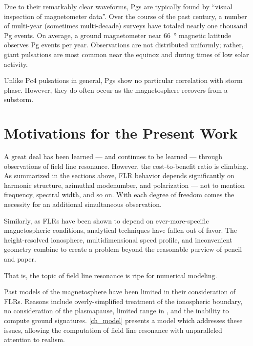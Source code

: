 

Due to their remarkably clear waveforms, Pgs are typically found by ``visual
inspection of magnetometer data''\cite{motoba_2015}. Over the course of the
past century, a number of multi-year (sometimes multi-decade\cite{brekke_1987})
surveys have totaled nearly one thousand Pg events. On average, a ground
magnetometer near \SI{66}{\degree} magnetic latitude observes  Pg
events per year\cite{brekke_1987,harang_1941,rolf_1931,sucksdorff_1939}.
Observations are not distributed uniformly; rather, giant pulsations are most
common near the equinox and during times of low solar activity. 

Unlike Pc4 pulsations in general, Pgs show no particular correlation with storm
phase\cite{motoba_2015}. However, they do often occur as the magnetosphere
recovers from a substorm\cite{motoba_2015,rostoker_1979}. 

\section{Motivations for the Present Work}

A great deal has been learned --- and continues to be learned --- through
observations of field line resonance. However, the cost-to-benefit ratio is
climbing. As summarized in the sections above, FLR behavior depends
significantly on harmonic structure, azimuthal modenumber, and polarization ---
not to mention frequency, spectral width, and so on. With each degree of
freedom comes the necessity for an additional simultaneous observation. 

Similarly, as FLRs have been shown to depend on ever-more-specific
magnetospheric conditions, analytical techniques have fallen out of favor. The
height-resolved ionosphere, multidimensional \Alfven speed profile, and
inconvenient geometry combine to create a problem beyond the reasonable purview
of pencil and paper. 

That is, the topic of field line resonance is ripe for numerical modeling. 

Past models of the magnetosphere have been limited in their consideration of
FLRs. Reasons include overly-simplified treatment of the ionospheric boundary,
no consideration of the plasmapause, limited range in \azm, and the inability
to compute ground signatures. \cref{ch_model} presents a model which addresses
these issues, allowing the computation of field line resonance with
unparalleled attention to realism. 

